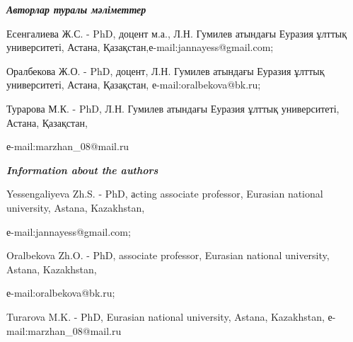 \emph{{\bfseries Авторлар туралы мәліметтер}}
\begin{noparindent}

Есенгалиева Ж.С. - PhD, доцент м.а., Л.Н. Гумилев атындағы Еуразия
ұлттық университеті, Астана, Қазақстан,е-mail:jannayess@gmail.com;

Оралбекова Ж.О. - PhD, доцент, Л.Н. Гумилев атындағы Еуразия ұлттық
университеті, Астана, Қазақстан, е-mail:oralbekova@bk.ru;

Турарова М.К. - PhD, Л.Н. Гумилев атындағы Еуразия ұлттық университеті,
Астана, Қазақстан,

е-mail:marzhan\_08@mail.ru
\end{noparindent}

\emph{{\bfseries Information about the authors}}
\begin{noparindent}

Yessengaliyeva Zh.S. - PhD, аcting associate professor, Eurasian
national university, Astana, Kazakhstan,

е-mail:jannayess@gmail.com;

Oralbekova Zh.O. - PhD, associate professor, Eurasian national
university, Astana, Kazakhstan,

е-mail:oralbekova@bk.ru;

Turarova M.K. - PhD, Eurasian national university, Astana, Kazakhstan,
е-mail:marzhan\_08@mail.ru
\end{noparindent}


